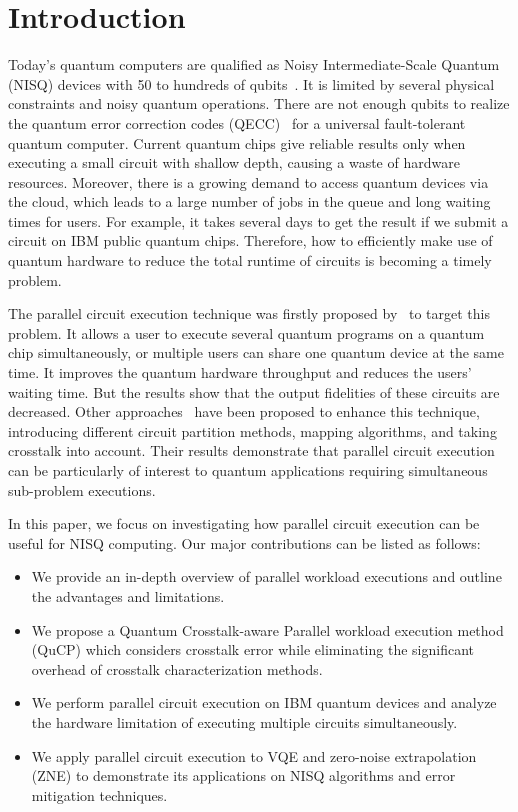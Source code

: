 \documentclass[conference]{IEEEtran}
\begin{document}
\section{Introduction}
Today's quantum computers are qualified as Noisy Intermediate-Scale Quantum (NISQ) devices with 50 to hundreds of qubits~\cite{preskill2018quantum}. It is limited by several physical constraints and noisy quantum operations. There are not enough qubits to realize the quantum error correction codes (QECC)~\cite{calderbank1998quantum} for a universal fault-tolerant quantum computer. Current quantum chips give reliable results only when executing a small circuit with shallow depth, causing a waste of hardware resources. Moreover, there is a growing demand to access quantum devices via the cloud, which leads to a large number of jobs in the queue and long waiting times for users. For example, it takes several days to get the result if we submit a circuit on IBM public quantum chips. Therefore, how to efficiently make use of quantum hardware to reduce the total runtime of circuits is becoming a timely problem. 

The parallel circuit execution technique was firstly proposed by~\cite{das2019case} to target this problem. It allows a user to execute several quantum programs on a quantum chip simultaneously, or multiple users can share one quantum device at the same time. It improves the quantum hardware throughput and reduces the users' waiting time. But the results show that the output fidelities of these circuits are decreased. Other approaches~\cite{liuqucloud, niu2021enabling, ohkuracrosstalk} have been proposed to enhance this technique, introducing different circuit partition methods, mapping algorithms, and taking crosstalk into account. Their results demonstrate that parallel circuit execution can be particularly of interest to quantum applications requiring simultaneous sub-problem executions. 

In this paper, we focus on investigating how parallel circuit execution can be useful for NISQ computing. Our major contributions can be listed as follows:
\begin{itemize}
\item We provide an in-depth overview of parallel workload executions and outline the advantages and limitations.

\item We propose a Quantum Crosstalk-aware Parallel workload execution method (QuCP) which considers crosstalk error while eliminating the significant overhead of crosstalk characterization methods.

\item We perform parallel circuit execution on IBM quantum devices and analyze the hardware limitation of executing multiple circuits simultaneously. 

\item We apply parallel circuit execution to VQE and zero-noise extrapolation (ZNE) to demonstrate its applications on NISQ algorithms and error mitigation techniques. 

\end{itemize}
\end{document}
